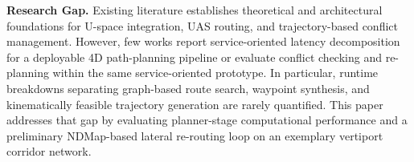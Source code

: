 \medskip
\noindent
\textbf{Research Gap.}
Existing literature establishes theoretical and architectural foundations for U-space integration, UAS routing, and trajectory-based conflict management. However, few works report service-oriented latency decomposition for a deployable 4D path-planning pipeline or evaluate conflict checking and re-planning within the same service-oriented prototype. In particular, runtime breakdowns separating graph-based route search, waypoint synthesis, and kinematically feasible trajectory generation are rarely quantified. This paper addresses that gap by evaluating planner-stage computational performance and a preliminary NDMap-based lateral re-routing loop on an exemplary vertiport corridor network.
